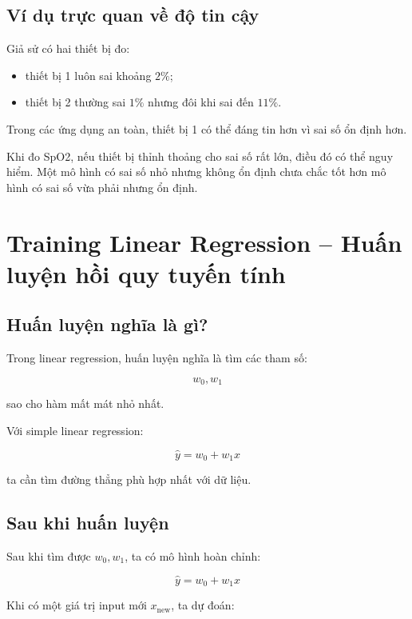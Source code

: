 \subsection{Ví dụ trực quan về độ tin cậy}

Giả sử có hai thiết bị đo:

\begin{itemize}
    \item thiết bị 1 luôn sai khoảng $2\%$;
    \item thiết bị 2 thường sai $1\%$ nhưng đôi khi sai đến $11\%$.
\end{itemize}

Trong các ứng dụng an toàn, thiết bị 1 có thể đáng tin hơn vì sai số ổn định hơn.

\begin{vidu}
Khi đo SpO2, nếu thiết bị thỉnh thoảng cho sai số rất lớn, điều đó có thể nguy hiểm. Một mô hình có sai số nhỏ nhưng không ổn định chưa chắc tốt hơn mô hình có sai số vừa phải nhưng ổn định.
\end{vidu}

\section{Training Linear Regression -- Huấn luyện hồi quy tuyến tính}

\subsection{Huấn luyện nghĩa là gì?}

Trong linear regression, huấn luyện nghĩa là tìm các tham số:

\[
    w_0,w_1
\]

sao cho hàm mất mát nhỏ nhất.

Với simple linear regression:

\[
    \hat{y}=w_0+w_1x
\]

ta cần tìm đường thẳng phù hợp nhất với dữ liệu.

\subsection{Sau khi huấn luyện}

Sau khi tìm được $w_0,w_1$, ta có mô hình hoàn chỉnh:

\[
    \hat{y}=w_0+w_1x
\]

Khi có một giá trị input mới $x_{\text{new}}$, ta dự đoán:

